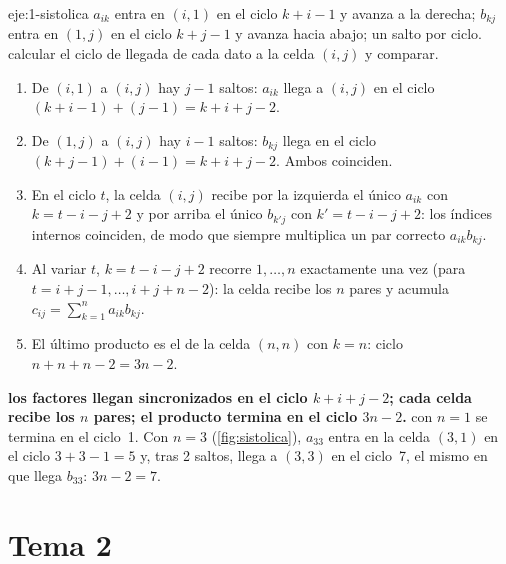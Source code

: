 \begin{solucion}{eje:1-sistolica}
\datos $a_{ik}$ entra en $(i,1)$ en el ciclo $k+i-1$ y avanza a la derecha; $b_{kj}$ entra en $(1,j)$ en el ciclo $k+j-1$ y avanza hacia abajo; un salto por ciclo.
\planteamiento calcular el ciclo de llegada de cada dato a la celda $(i,j)$ y comparar.
\pasos
\begin{enumerate}[label=\arabic*.]
  \item De $(i,1)$ a $(i,j)$ hay $j-1$ saltos: $a_{ik}$ llega a $(i,j)$ en el ciclo $(k+i-1)+(j-1)=k+i+j-2$.
  \item De $(1,j)$ a $(i,j)$ hay $i-1$ saltos: $b_{kj}$ llega en el ciclo $(k+j-1)+(i-1)=k+i+j-2$. Ambos coinciden.
  \item En el ciclo $t$, la celda $(i,j)$ recibe por la izquierda el único $a_{ik}$ con $k=t-i-j+2$ y por arriba el único $b_{k'j}$ con $k'=t-i-j+2$: los índices internos coinciden, de modo que siempre multiplica un par correcto $a_{ik}b_{kj}$.
  \item Al variar $t$, $k=t-i-j+2$ recorre $1,\dots,n$ exactamente una vez (para $t=i+j-1,\dots,i+j+n-2$): la celda recibe los $n$ pares y acumula $c_{ij}=\sum_{k=1}^{n}a_{ik}b_{kj}$.
  \item El último producto es el de la celda $(n,n)$ con $k=n$: ciclo $n+n+n-2=3n-2$. \qedhere
\end{enumerate}
\resultado \textbf{los factores llegan sincronizados en el ciclo $k+i+j-2$; cada celda recibe los $n$ pares; el producto termina en el ciclo $3n-2$.}
\comprobacion con $n=1$ se termina en el ciclo~1. Con $n=3$ (\cref{fig:sistolica}), $a_{33}$ entra en la celda $(3,1)$ en el ciclo $3+3-1=5$ y, tras 2 saltos, llega a $(3,3)$ en el ciclo~7, el mismo en que llega $b_{33}$: $3n-2=7$.
\end{solucion}

\section{Tema 2}

